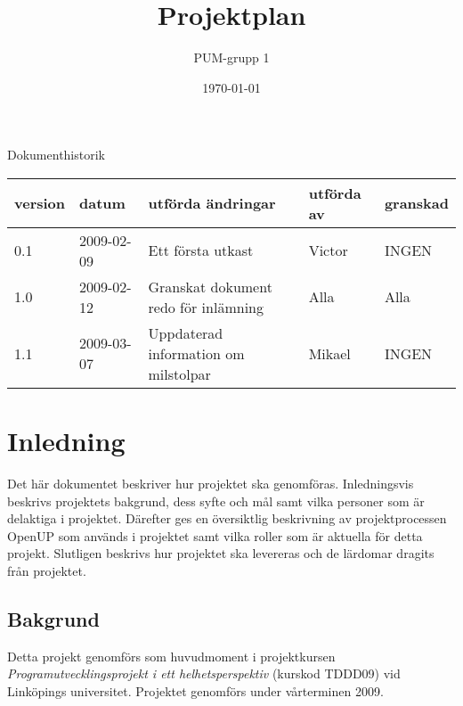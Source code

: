 

\ifpdf
\else
\fi

\title{Projektplan}
\author{PUM-grupp 1}
\date{\today}



\maketitle\thispagestyle{empty}

\newpage

{\centering \Large{Dokumenthistorik\\}}

\vspace{10pt}
\begin{tabularx}{\textwidth}{ |l|l|X|l|l| }
  \hline
    \textbf{version} & \textbf{datum} & \textbf{utförda ändringar} & \textbf{utförda av} & \textbf{granskad} \\
	\hline 0.1 & 2009-02-09 & Ett första utkast & Victor & INGEN \\
	\hline 1.0 & 2009-02-12 & Granskat dokument redo för inlämning & Alla & Alla \\
	\hline 1.1 & 2009-03-07 & Uppdaterad information om milstolpar & Mikael & INGEN \\
  \hline
\end{tabularx}

\newpage

\setcounter{tocdepth}{2}
\tableofcontents
\newpage

\section{Inledning}
Det här dokumentet beskriver hur projektet ska genomföras. Inledningsvis beskrivs projektets bakgrund, dess syfte och mål samt vilka personer som är delaktiga i projektet. Därefter ges en översiktlig beskrivning av projektprocessen OpenUP som används i projektet samt vilka roller som är aktuella för detta projekt. Slutligen beskrivs hur projektet ska levereras och de lärdomar dragits från projektet.

\subsection{Bakgrund}
Detta projekt genomförs som huvudmoment i projektkursen \textit{Programutvecklingsprojekt i ett helhetsperspektiv} (kurskod TDDD09) vid Linköpings universitet. Projektet genomförs under vårterminen 2009.

